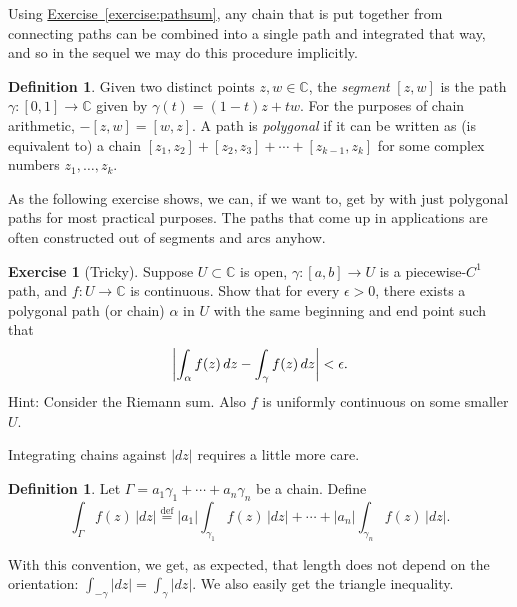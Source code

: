 \documentclass[12pt,openany]{book}
\newcommand{\glsadd}[2][]{}
\newcommand{\avoidbreak}{\postdisplaypenalty=100}
\newcommand{\sabs}[1]{\lvert {#1} \rvert}
\newcommand{\abs}[1]{\left\lvert {#1} \right\rvert}
\newcommand{\C}{{\mathbb{C}}}
\newcommand{\myindex}[1]{#1\index{#1}}
\theoremstyle{plain}
\theoremstyle{remark}
\theoremstyle{definition}
\newtheorem{defn}[thm]{Definition}
\newenvironment{exbox}{%
    \def\FrameCommand{\vrule width 1pt \relax\hspace{10pt}}%
    \MakeFramed{\advance\hsize-\width\FrameRestore}%
}{%
    \endMakeFramed
}
\theoremstyle{exercise}
\newtheorem{exercise}{Exercise}[section]
\theoremstyle{example}
\newcommand{\exerciseref}[1]{\hyperref[#1]{Exercise~\ref*{#1}}}
\begin{document}
Using \exerciseref{exercise:pathsum},
any chain that is put together
from connecting paths can be combined into
a single path and integrated that way,
and so in the sequel we may do this procedure implicitly.

\begin{defn}
\pagebreak[2]
\glsadd{not:segment}%
Given two distinct points $z,w \in \C$, the \emph{\myindex{segment}} $[z,w]$ is the path
$\gamma \colon [0,1] \to \C$ given by $\gamma(t) = (1-t)z + tw$.
For the purposes of chain arithmetic, $-[z,w] = [w,z]$.
A path is \emph{\myindex{polygonal}} if it can be written as
(is equivalent to) a chain
$[z_1,z_2] + [z_2,z_3] + \cdots + [z_{k-1},z_k]$ for some complex numbers
$z_1,\ldots,z_k$.
\end{defn}

As the following exercise shows, we can, if we want to, get by
with just polygonal paths for most practical purposes.
The paths that come up in applications are often constructed out of
segments and arcs anyhow.

\begin{exbox}
\begin{exercise}[Tricky]
Suppose $U \subset \C$ is open, $\gamma \colon [a,b] \to U$ is a
piecewise-$C^1$ path, and $f \colon U \to \C$ is continuous.
Show that for every $\epsilon > 0$,
there exists a polygonal path (or chain) $\alpha$ in $U$ with the same
beginning and end point such that
\begin{equation*}
\abs{\int_\alpha f(z)\, dz - \int_{\gamma} f(z) \, dz} < \epsilon .
\avoidbreak
\end{equation*}
Hint: Consider the Riemann sum.  Also $f$ is uniformly continuous on some
smaller $U$.
\end{exercise}
\end{exbox}

Integrating chains against $\sabs{dz}$ requires a little more care.

\begin{defn} \label{defn:absdzchainint}
Let $\Gamma = a_1 \gamma_1 + \cdots + a_n \gamma_n$ be a chain.  Define
\begin{equation*}
\int_\Gamma f(z) \, \sabs{dz}
\overset{\text{def}}{=}
\sabs{a_1}
\int_{\gamma_1} f(z) \, \sabs{dz}
+
\cdots
+
\sabs{a_n}
\int_{\gamma_n} f(z) \, \sabs{dz} .
\end{equation*}
\end{defn}

With this convention, we get, as expected, that length does not depend
on the orientation: $\int_{-\gamma} \sabs{dz} = \int_{\gamma} \sabs{dz}$.
We also easily get the triangle inequality.
\end{document}
